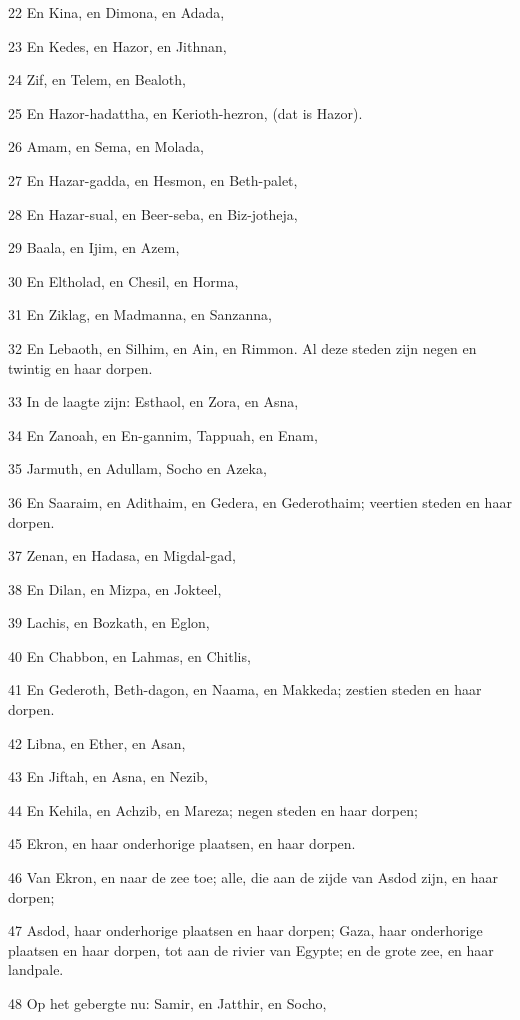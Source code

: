\par 22 En Kina, en Dimona, en Adada,
\par 23 En Kedes, en Hazor, en Jithnan,
\par 24 Zif, en Telem, en Bealoth,
\par 25 En Hazor-hadattha, en Kerioth-hezron, (dat is Hazor).
\par 26 Amam, en Sema, en Molada,
\par 27 En Hazar-gadda, en Hesmon, en Beth-palet,
\par 28 En Hazar-sual, en Beer-seba, en Biz-jotheja,
\par 29 Baala, en Ijim, en Azem,
\par 30 En Eltholad, en Chesil, en Horma,
\par 31 En Ziklag, en Madmanna, en Sanzanna,
\par 32 En Lebaoth, en Silhim, en Ain, en Rimmon. Al deze steden zijn negen en twintig en haar dorpen.
\par 33 In de laagte zijn: Esthaol, en Zora, en Asna,
\par 34 En Zanoah, en En-gannim, Tappuah, en Enam,
\par 35 Jarmuth, en Adullam, Socho en Azeka,
\par 36 En Saaraim, en Adithaim, en Gedera, en Gederothaim; veertien steden en haar dorpen.
\par 37 Zenan, en Hadasa, en Migdal-gad,
\par 38 En Dilan, en Mizpa, en Jokteel,
\par 39 Lachis, en Bozkath, en Eglon,
\par 40 En Chabbon, en Lahmas, en Chitlis,
\par 41 En Gederoth, Beth-dagon, en Naama, en Makkeda; zestien steden en haar dorpen.
\par 42 Libna, en Ether, en Asan,
\par 43 En Jiftah, en Asna, en Nezib,
\par 44 En Kehila, en Achzib, en Mareza; negen steden en haar dorpen;
\par 45 Ekron, en haar onderhorige plaatsen, en haar dorpen.
\par 46 Van Ekron, en naar de zee toe; alle, die aan de zijde van Asdod zijn, en haar dorpen;
\par 47 Asdod, haar onderhorige plaatsen en haar dorpen; Gaza, haar onderhorige plaatsen en haar dorpen, tot aan de rivier van Egypte; en de grote zee, en haar landpale.
\par 48 Op het gebergte nu: Samir, en Jatthir, en Socho,
